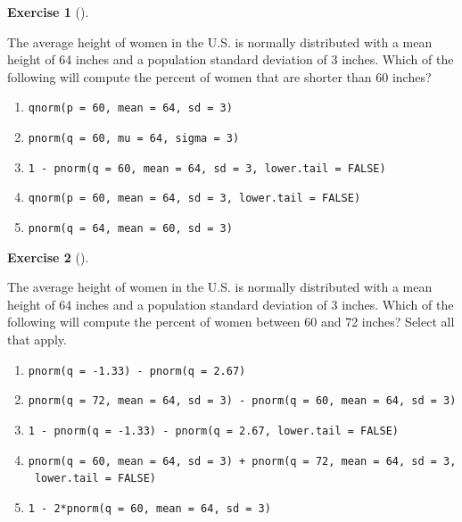 \documentclass[
  letterpaper,
  DIV=11,
  numbers=noendperiod]{scrreprt}
\providecommand{\tightlist}{%
  \setlength{\itemsep}{0pt}\setlength{\parskip}{0pt}}\usepackage{longtable,booktabs,array}
\theoremstyle{definition}
\newtheorem{exercise}{Exercise}[chapter]
\theoremstyle{remark}
\begin{document}
\begin{exercise}[]\protect\hypertarget{exr-ch09-03}{}\label{exr-ch09-03}

The average height of women in the U.S. is normally distributed with a
mean height of 64 inches and a population standard deviation of 3
inches. Which of the following will compute the percent of women that
are shorter than 60 inches?

\begin{enumerate}
\def\labelenumi{\alph{enumi})}
\tightlist
\item
  \texttt{qnorm(p\ =\ 60,\ mean\ =\ 64,\ sd\ =\ 3)}
\item
  \texttt{pnorm(q\ =\ 60,\ mu\ =\ 64,\ sigma\ =\ 3)}
\item
  \texttt{1\ -\ pnorm(q\ =\ 60,\ mean\ =\ 64,\ sd\ =\ 3,\ lower.tail\ =\ FALSE)}
\item
  \texttt{qnorm(p\ =\ 60,\ mean\ =\ 64,\ sd\ =\ 3,\ lower.tail\ =\ FALSE)}
\item
  \texttt{pnorm(q\ =\ 64,\ mean\ =\ 60,\ sd\ =\ 3)}
\end{enumerate}

\end{exercise}

\begin{exercise}[]\protect\hypertarget{exr-ch09-04}{}\label{exr-ch09-04}

The average height of women in the U.S. is normally distributed with a
mean height of 64 inches and a population standard deviation of 3
inches. Which of the following will compute the percent of women between
60 and 72 inches? Select all that apply.

\begin{enumerate}
\def\labelenumi{\alph{enumi})}
\tightlist
\item
  \texttt{pnorm(q\ =\ -1.33)\ -\ pnorm(q\ =\ 2.67)}
\item
  \texttt{pnorm(q\ =\ 72,\ mean\ =\ 64,\ sd\ =\ 3)\ -\ pnorm(q\ =\ 60,\ mean\ =\ 64,\ sd\ =\ 3)}
\item
  \texttt{1\ -\ pnorm(q\ =\ -1.33)\ -\ pnorm(q\ =\ 2.67,\ lower.tail\ =\ FALSE)}
\item
  \texttt{pnorm(q\ =\ 60,\ mean\ =\ 64,\ sd\ =\ 3)\ +\ pnorm(q\ =\ 72,\ mean\ =\ 64,\ sd\ =\ 3,\ lower.tail\ =\ FALSE)}
\item
  \texttt{1\ -\ 2*pnorm(q\ =\ 60,\ mean\ =\ 64,\ sd\ =\ 3)}
\end{enumerate}

\end{exercise}
\end{document}
